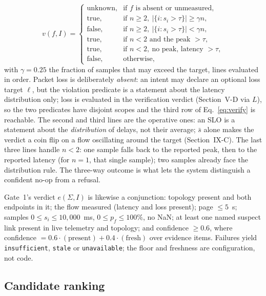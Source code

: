 \documentclass[conference]{IEEEtran}
\begin{document}
\begin{equation}
v(f,I)=
\begin{cases}
\text{unknown}, & \text{if } f \text{ is absent or unmeasured,}\\
\text{true},     & \text{if } n \ge 2,\ \bigl|\{i:s_i>\tau\}\bigr| \ge \gamma n,\\
\text{false},    & \text{if } n \ge 2,\ \bigl|\{i:s_i>\tau\}\bigr| < \gamma n,\\
\text{true},     & \text{if } n < 2 \text{ and the peak } > \tau,\\
\text{true},     & \text{if } n < 2,\ \text{no peak, latency } > \tau,\\
\text{false},    & \text{otherwise},
\end{cases}
\label{eq:violation}
\end{equation}
with $\gamma=0.25$ the fraction of samples that may exceed the target,
lines evaluated in order. Packet loss is deliberately \emph{absent}: an
intent may declare an optional loss target $\ell$, but the violation
predicate is a statement about the latency distribution only; loss is
evaluated in the verification verdict (Section~V-D via $L$), so the two
predicates have disjoint scopes and the third row of Eq.~\eqref{eq:verify}
is reachable. The second and third lines are the operative ones: an SLO is
a statement about the \emph{distribution} of delays, not their average;
$\bar{s}$ alone makes the verdict a coin flip on a flow oscillating around
the target (Section~IX-C). The last three lines handle $n<2$: one sample
falls back to the reported peak, then to the reported latency (for $n=1$,
that single sample); two samples already face the distribution rule. The
three-way outcome is what lets the system distinguish a confident no-op
from a refusal.

Gate~1's verdict $e(\Sigma,I)$ is likewise a conjunction: topology present
and both endpoints in it; the flow measured (latency and loss present);
page $\le 5$~s; samples $0\le s_i\le 10{,}000$~ms, $0\le p_f\le 100\%$,
no NaN; at least one named suspect link present in live telemetry and
topology; and confidence $\ge 0.6$, where confidence $=
0.6\cdot(\mathrm{present})+0.4\cdot(\mathrm{fresh})$ over evidence items.
Failures yield \texttt{insufficient}, \texttt{stale} or
\texttt{unavailable}; the floor and freshness are configuration, not code.

\subsection{Candidate ranking}
\end{document}
